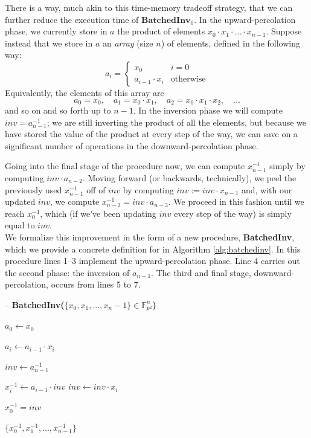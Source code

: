There is a way, much akin to this time-memory tradeoff strategy, that we can further reduce the execution time of $\textbf{BatchedInv}_0$. In the upward-percolation phase, we currently store in $a$ the product of elements $x_0 \cdot x_1 \cdot ... \cdot x_{n-1}$. Suppose instead that we store in $a$ an \emph{array} (size $n$) of elements, defined in the following way:
$$
a_i =
\begin{cases}
x_0 & i = 0\\
a_{i-1} \cdot x_i & \text{otherwise}
\end{cases}
$$
Equivalently, the elements of this array are
$$
a_0 = x_0, \quad a_1 = x_0 \cdot x_1, \quad a_2 = x_0 \cdot x_1 \cdot x_2, \quad ...
$$
and so on and so forth up to $n-1$. In the inversion phase we will compute $inv = a_{n-1}^{-1}$; we are still inverting the product of all the elements, but because we have stored the value of the product at every step of the way, we can save on a significant number of operations in the downward-percolation phase.

Going into the final stage of the procedure now, we can compute $x_{n-1}^{-1}$ simply by computing $inv \cdot a_{n-2}$. Moving forward (or backwards, technically), we peel the previously used $x_{n-1}^{-1}$ off of $inv$ by computing $inv := inv \cdot x_{n-1}$ and, with our updated $inv$, we compute $x_{n-2}^{-1} = inv \cdot a_{n-3}$. We proceed in this fashion until we reach $x_{0}^{-1}$, which (if we've been updating $inv$ every step of the way) is simply equal to $inv$.\\

We formalize this improvement in the form of a new procedure, \textbf{BatchedInv}, which we provide a concrete definition for in Algorithm \ref{alg:batchedinv}. In this procedure lines 1--3 implement the upward-percolation phase. Line 4 carries out the second phase: the inversion of $a_{n-1}$. The third and final stage, downward-percolation, occurs from lines 5 to 7.

\begin{algorithm}
\caption{-- \textbf{BatchedInv($\{x_0, x_1, ..., x_n-1\} \in \mathbb{F}_{p^{2}}^{n}$)}}\label{alg:batchedinv}
\begin{algorithmic}[1]
\State $a_0 \gets x_0$

	\State $a_i \gets a_{i-1} \cdot x_i$
\EndFor

\State $inv \gets a_{n-1}^{-1}$

	\State $x_i^{-1} \gets a_{i-1} \cdot inv$
	\State $inv \gets inv \cdot x_{i}$
\EndFor

\State $x_0^{-1} = inv$

\State \Return $\{x_0^{-1}, x_1^{-1}, ..., x_{n-1}^{-1}\}$

\end{algorithmic}
\end{algorithm}

